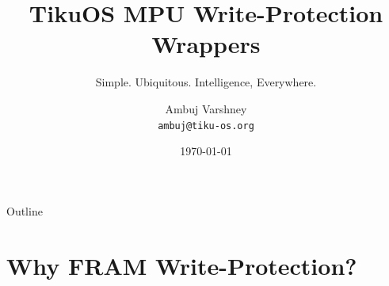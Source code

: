 \documentclass[aspectratio=169, 10pt]{beamer}
\title[TikuOS MPU]{TikuOS MPU Write-Protection Wrappers}
\subtitle{Simple. Ubiquitous. Intelligence, Everywhere.}
\author[Ambuj Varshney]{Ambuj Varshney \\ \texttt{ambuj@tiku-os.org}}
\date{\today}
\begin{document}
\begin{frame}
\titlepage
\end{frame}

\begin{frame}{Outline}
\tableofcontents
\end{frame}

\section{Why FRAM Write-Protection?}
\end{document}
